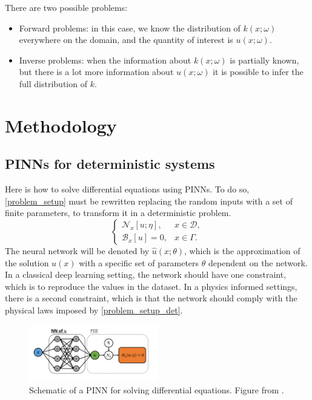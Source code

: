 \documentclass[11pt,a4paper]{article}
\begin{document}
There are two possible problems: 
\begin{itemize}
    \item Forward problems: in this case, we know the distribution of \(k(x;\omega)\) everywhere on the domain, and the quantity of interest is \(u(x;\omega)\).
    \item Inverse problems: when the information about \(k(x;\omega)\) is partially known, but there is a lot more information about \(u(x;\omega)\) it is possible to infer the full distribution of \(k\).
\end{itemize}

\section{Methodology}
\subsection{PINNs for deterministic systems}
Here is how to solve differential equations using PINNs. To do so, \eqref{problem_setup} must be rewritten replacing the random inputs with a set of finite parameters, to transform it in a deterministic problem.
\begin{equation}
    \begin{cases}
        \mathcal{N}_x\left[ u; \eta \right], & x \in \mathcal{D}, \\
        \mathcal{B}_x\left[ u \right] = 0, & x \in \Gamma.
    \end{cases}
    \label{problem_setup_det}
\end{equation}
The neural network will be denoted by \(\hat{u}(x;\theta)\), which is the approximation of the solution \(u(x)\) with a specific set of parameters \(\theta\) dependent on the network. In a classical deep learning setting, the network should have one constraint, which is to reproduce the values in the dataset. In a physics informed settings, there is a second constraint, which is that the network should comply with the physical laws imposed by \eqref{problem_setup_det}. 
\begin{figure}[H]
    \centering 
    \includegraphics[width=0.5\textwidth]{Images/PINN_structure.png}
    \captionsetup{justification=centering,margin=1cm}
    \caption{Schematic of a PINN for solving differential equations. Figure from \cite{Zhang_2019}.}
\end{figure}
\end{document}
